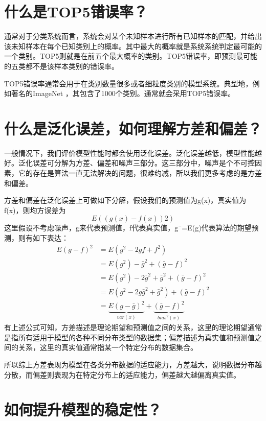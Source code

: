 \section{什么是TOP5错误率？}\label{ux4ec0ux4e48ux662ftop5ux9519ux8befux7387}

通常对于分类系统而言，系统会对某个未知样本进行所有已知样本的匹配，并给出该未知样本在每个已知类别上的概率。其中最大的概率就是系统系统判定最可能的一个类别。TOP5则就是在前五个最大概率的类别。TOP5错误率，即预测最可能的五类都不是该样本类别的错误率。

TOP5错误率通常会用于在类别数量很多或者细粒度类别的模型系统。典型地，例如著名的ImageNet
，其包含了1000个类别。通常就会采用TOP5错误率。

\section{什么是泛化误差，如何理解方差和偏差？}\label{ux4ec0ux4e48ux662fux6cdbux5316ux8befux5deeux5982ux4f55ux7406ux89e3ux65b9ux5deeux548cux504fux5dee}

一般情况下，我们评价模型性能时都会使用泛化误差。泛化误差越低，模型性能越好。泛化误差可分解为方差、偏差和噪声三部分。这三部分中，噪声是个不可控因素，它的存在是算法一直无法解决的问题，很难约减，所以我们更多考虑的是方差和偏差。

方差和偏差在泛化误差上可做如下分解，假设我们的预测值为g(x)，真实值为f(x)，则均方误差为
\[
E((g(x)−f(x))2)
\]
这里假设不考虑噪声，g来代表预测值，f代表真实值，g¯=E(g)代表算法的期望预测，则有如下表达：
\[
\begin{align}
E(g-f)^2&=E(g^2-2gf+f^2)
\\&=E(g^2)-\bar g^2+(\bar g-f)^2
\\&=E(g^2)-2\bar g^2+\bar g^2+(\bar g-f)^2
\\&=E(g^2-2g\bar g^2+\bar g^2)+(\bar g-f)^2
\\&=\underbrace{E(g-\bar g)^2}_{var(x)}+\underbrace{(\bar g-f)^2}_{bias^2(x)}
\end{align}
\]
有上述公式可知，方差描述是理论期望和预测值之间的关系，这里的理论期望通常是指所有适用于模型的各种不同分布类型的数据集；偏差描述为真实值和预测值之间的关系，这里的真实值通常指某一个特定分布的数据集合。

所以综上方差表现为模型在各类分布数据的适应能力，方差越大，说明数据分布越分散，而偏差则表现为在特定分布上的适应能力，偏差越大越偏离真实值。

\section{如何提升模型的稳定性？}\label{ux5982ux4f55ux63d0ux5347ux6a21ux578bux7684ux7a33ux5b9aux6027}

